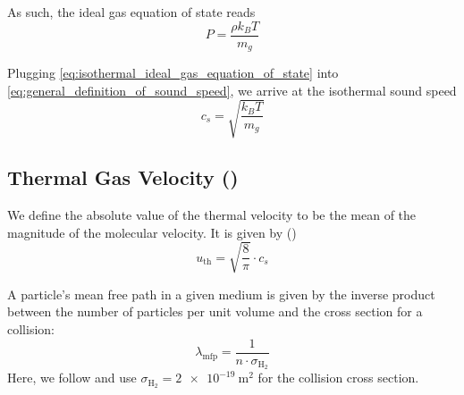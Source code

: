          As such, the ideal gas equation of state reads 
        \begin{equation}
            \label{eq:isothermal_ideal_gas_equation_of_state}
            P = \frac{\rho k_B T}{m_g}
        \end{equation}

        Plugging \cref{eq:isothermal_ideal_gas_equation_of_state} into
        \cref{eq:general_definition_of_sound_speed}, we arrive at the isothermal sound speed
        \begin{equation}
            c_s = \sqrt{\frac{k_BT}{m_g}}
        \end{equation}


        

    \clearpage\subsection{Thermal Gas Velocity ()}

        We define the absolute value of the thermal velocity to be the mean of the magnitude
        of the molecular velocity. It is given by ()
        \begin{equation}
            u_\text{th} = \sqrt{\frac{8}{\pi}} \cdot c_s
        \end{equation}

        A particle's mean free path in a given medium is given by the inverse product between the 
        number of particles per unit volume and the cross section for a collision:
        \begin{equation}
            \lambda_\text{mfp} = \frac{1}{n \cdot \sigma_{\text{H}_2}}
        \end{equation}
        Here, we follow \cite{birnstiel_dullemond_brauer_2010} and use 
        $\sigma_{\text{H}_2} = \SI{2e-19}{\meter^2}$ for the collision cross section. \\

